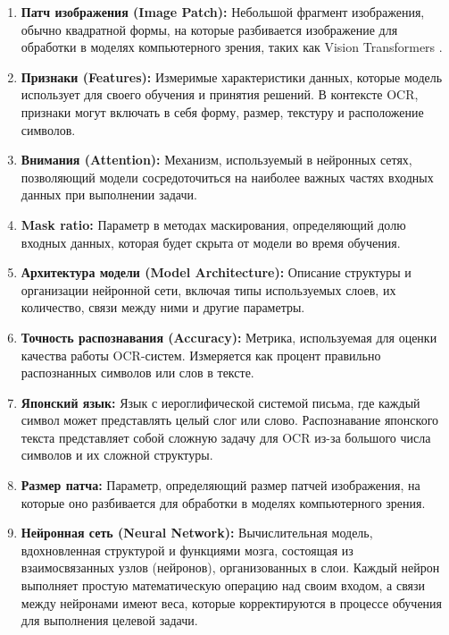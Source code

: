 \begin{enumerate}

    \item \textbf{Патч изображения (Image Patch):} Небольшой фрагмент изображения, обычно квадратной формы, на которые разбивается изображение для обработки в моделях компьютерного зрения, таких как Vision Transformers \cite{dosovitskiy2020image}.

    \item \textbf{Признаки (Features):}  Измеримые  характеристики  данных,  которые  модель  использует  для  своего  обучения  и  принятия  решений.  В  контексте  OCR,  признаки  могут  включать  в  себя  форму,  размер,  текстуру  и  расположение  символов.

    \item \textbf{Внимания (Attention):} Механизм,  используемый  в  нейронных  сетях,  позволяющий  модели  сосредоточиться  на  наиболее  важных  частях  входных  данных  при  выполнении  задачи.

    \item \textbf{Mask ratio:}  Параметр  в  методах  маскирования,  определяющий  долю  входных  данных,  которая  будет  скрыта  от  модели  во  время  обучения.  

    \item \textbf{Архитектура модели (Model Architecture):} Описание структуры и организации нейронной сети, включая типы используемых слоев, их количество, связи между ними и другие параметры.

    \item \textbf{Точность распознавания (Accuracy):}  Метрика,  используемая  для  оценки  качества  работы  OCR-систем.  Измеряется  как  процент  правильно  распознанных  символов  или  слов  в  тексте.

    \item \textbf{Японский язык:} Язык с  иероглифической  системой письма,  где  каждый символ может представлять целый слог  или  слово.   Распознавание японского текста представляет собой сложную задачу для OCR  из-за  большого  числа  символов и  их  сложной  структуры.

    \item \textbf{Размер патча:} Параметр, определяющий размер патчей изображения, на которые оно разбивается для обработки в моделях компьютерного зрения.

    \item \textbf{Нейронная сеть (Neural Network):} Вычислительная модель, вдохновленная структурой и функциями мозга, состоящая из взаимосвязанных узлов (нейронов), организованных в слои. Каждый нейрон выполняет простую математическую операцию над своим входом, а связи между нейронами имеют веса, которые корректируются в процессе обучения для выполнения целевой задачи.


\end{enumerate}

